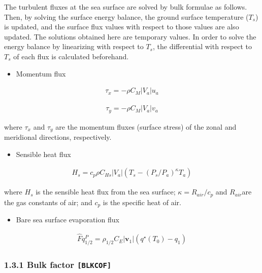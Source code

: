 The turbulent fluxes at the sea surface are solved by bulk formulae as
follows. Then, by solving the surface energy balance, the ground surface
temperature (\(T_s\)) is updated, and the surface flux values with
respect to those values are also updated. The solutions obtained here
are temporary values. In order to solve the energy balance by
linearizing with respect to \(T_s\), the differential with respect to
\(T_s\) of each flux is calculated beforehand.

\begin{itemize}
\tightlist
\item
  Momentum flux
\end{itemize}

\begin{eqnarray}
 \tau_x = - \rho C_{M}|V_a| u_a
\end{eqnarray}

\begin{eqnarray}
 \tau_y = - \rho C_{M}|V_a| v_a
\end{eqnarray}

where \(\tau_x\) and \(\tau_y\) are the momentum fluxes (surface stress)
of the zonal and meridional directions, respectively.

\begin{itemize}
\tightlist
\item
  Sensible heat flux
\end{itemize}

\begin{eqnarray}
 H_s = c_p \rho C_{Hs}|V_a| (T_s - (P_s/P_a)^{\kappa}T_a)
\end{eqnarray}

where \(H_s\) is the sensible heat flux from the sea surface;
\(\kappa = R_{air} / c_p\) and \(R_{air}\)are the gas constants of air;
and \(c_p\) is the specific heat of air.

\begin{itemize}
\tightlist
\item
  Bare sea surface evaporation flux
\end{itemize}

\begin{eqnarray}
\hat{F}q^P_{1/2} = \rho_{1/2} C_E |{\mathbf{v}}_1| \left( q^\star(T_0) - q_1 \right)
\end{eqnarray}

\hypertarget{bulk-factor-blkcof}{%
\subsubsection{\texorpdfstring{1.3.1 Bulk factor
\texttt{{[}BLKCOF{]}}}{1.3.1 Bulk factor {[}BLKCOF{]}}}\label{bulk-factor-blkcof}}

